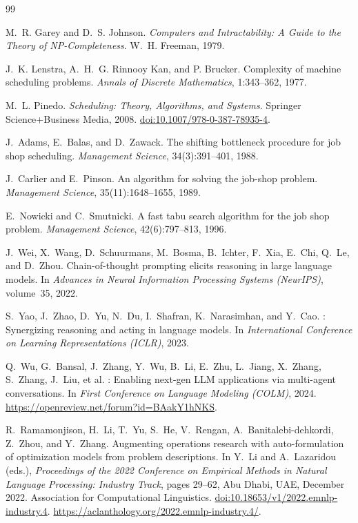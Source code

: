 \documentclass[11pt]{article}
\begin{document}
\begin{thebibliography}{99}

M.~R. Garey and D.~S. Johnson.
\newblock \emph{Computers and Intractability: A Guide to the Theory of NP-Completeness}.
\newblock W.~H. Freeman, 1979.

J.~K. Lenstra, A.~H.~G. Rinnooy Kan, and P. Brucker.
\newblock Complexity of machine scheduling problems.
\newblock \emph{Annals of Discrete Mathematics}, 1:343--362, 1977.

M.~L. Pinedo.
\newblock \emph{Scheduling: Theory, Algorithms, and Systems}.
\newblock Springer Science+Business Media, 2008.
\newblock \href{https://doi.org/10.1007/978-0-387-78935-4}{doi:10.1007/978-0-387-78935-4}.

J.~Adams, E.~Balas, and D.~Zawack.
\newblock The shifting bottleneck procedure for job shop scheduling.
\newblock \emph{Management Science}, 34(3):391--401, 1988.

J.~Carlier and E.~Pinson.
\newblock An algorithm for solving the job-shop problem.
\newblock \emph{Management Science}, 35(11):1648--1655, 1989.

E.~Nowicki and C.~Smutnicki.
\newblock A fast tabu search algorithm for the job shop problem.
\newblock \emph{Management Science}, 42(6):797--813, 1996.

J.~Wei, X.~Wang, D.~Schuurmans, M.~Bosma, B.~Ichter, F.~Xia, E.~Chi, Q.~Le, and D.~Zhou.
\newblock Chain-of-thought prompting elicits reasoning in large language models.
\newblock In \emph{Advances in Neural Information Processing Systems (NeurIPS)}, volume~35, 2022.

S.~Yao, J.~Zhao, D.~Yu, N.~Du, I.~Shafran, K.~Narasimhan, and Y.~Cao.
: Synergizing reasoning and acting in language models.
\newblock In \emph{International Conference on Learning Representations (ICLR)}, 2023.

Q.~Wu, G.~Bansal, J.~Zhang, Y.~Wu, B.~Li, E.~Zhu, L.~Jiang, X.~Zhang, S.~Zhang, J.~Liu, et al.
: Enabling next-gen {LLM} applications via multi-agent conversations.
\newblock In \emph{First Conference on Language Modeling (COLM)}, 2024.
\newblock \url{https://openreview.net/forum?id=BAakY1hNKS}.

R.~Ramamonjison, H.~Li, T.~Yu, S.~He, V.~Rengan, A.~Banitalebi-dehkordi, Z.~Zhou, and Y.~Zhang.
\newblock Augmenting operations research with auto-formulation of optimization models from problem descriptions.
\newblock In Y.~Li and A.~Lazaridou (eds.), \emph{Proceedings of the 2022 Conference on Empirical Methods in Natural Language Processing: Industry Track}, pages 29--62, Abu Dhabi, UAE, December 2022. Association for Computational Linguistics.
\newblock \href{https://doi.org/10.18653/v1/2022.emnlp-industry.4}{doi:10.18653/v1/2022.emnlp-industry.4}.
\newblock \url{https://aclanthology.org/2022.emnlp-industry.4/}.

\end{thebibliography}
\end{document}
